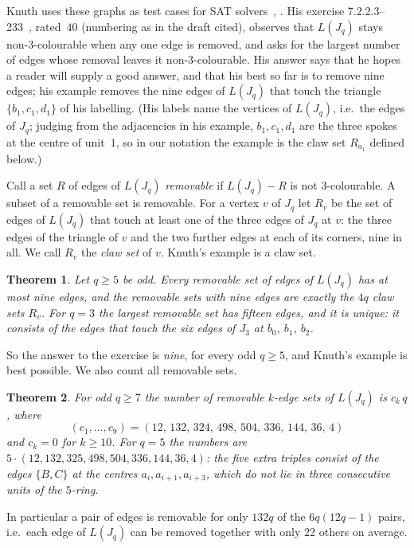 \documentclass[11pt]{amsart}
\newtheorem{theorem}{Theorem}
\theoremstyle{remark}
\begin{document}
Knuth uses these graphs as test cases for SAT solvers~\cite[\S7.2.2.2, ex.~176]{knuth4b}, \cite[\S7.2.2.3]{knuth7}.
His exercise 7.2.2.3--233~\cite{knuth7}, rated~$40$ (numbering as in the draft cited), observes that $L(J_q)$ stays non-$3$-colourable when any one
edge is removed, and asks for the largest number of edges whose removal leaves it non-$3$-colourable.
His answer says that he hopes a reader will supply a good answer, and that his best so far is to remove nine
edges; his example removes the nine edges of $L(J_q)$ that touch the triangle $\{b_1,c_1,d_1\}$ of his
labelling. (His labels name the vertices of $L(J_q)$, i.e.\ the edges of $J_q$; judging from the adjacencies in
his example, $b_1,c_1,d_1$ are the three spokes at the centre of unit~$1$, so in our notation the example is the
claw set $R_{a_1}$ defined below.)

Call a set $R$ of edges of $L(J_q)$ \emph{removable} if $L(J_q)-R$ is not $3$-colourable. A subset of a removable
set is removable. For a vertex $v$ of $J_q$ let $R_v$ be the set of edges of $L(J_q)$ that touch at least one of
the three edges of $J_q$ at $v$: the three edges of the triangle of $v$ and the two further edges at each of its
corners, nine in all. We call $R_v$ the \emph{claw set} of $v$. Knuth's example is a claw set.

\begin{theorem}\label{thm:main}
Let $q\ge5$ be odd. Every removable set of edges of $L(J_q)$ has at most nine edges, and the removable sets with
nine edges are exactly the $4q$ claw sets $R_v$. For $q=3$ the largest removable set has fifteen edges, and it
is unique: it consists of the edges that touch the six edges of $J_3$ at $b_0$, $b_1$, $b_2$.
\end{theorem}

So the answer to the exercise is \emph{nine}, for every odd $q\ge5$, and Knuth's example is best possible. We
also count all removable sets.

\begin{theorem}\label{thm:count}
For odd $q\ge7$ the number of removable $k$-edge sets of $L(J_q)$ is $c_k\,q$, where
\[(c_1,\dots,c_9)=(12,\,132,\,324,\,498,\,504,\,336,\,144,\,36,\,4)\]
and $c_k=0$ for $k\ge10$. For $q=5$ the numbers are $5\cdot(12,132,325,498,504,336,144,36,4)$: the five
extra triples consist of the edges $\{B,C\}$ at the centres $a_i,a_{i+1},a_{i+3}$, which do not lie in three
consecutive units of the $5$-ring.
\end{theorem}

In particular a pair of edges is removable for only $132q$ of the $6q(12q-1)$ pairs, i.e.\ each edge of $L(J_q)$ can
be removed together with only $22$ others on average.
\end{document}
